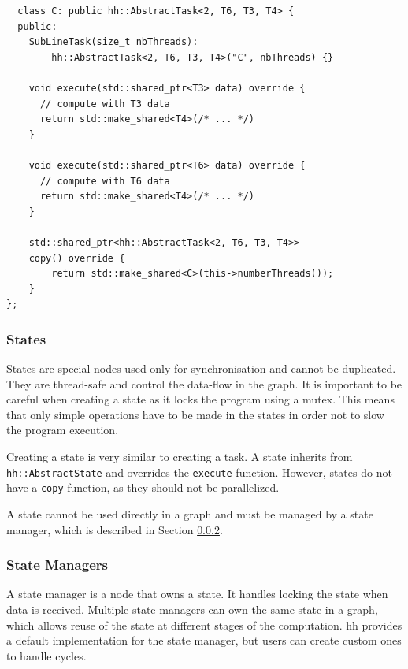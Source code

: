 \begin{listing}[ht!]
\begin{verbatim}
  class C: public hh::AbstractTask<2, T6, T3, T4> {
  public:
    SubLineTask(size_t nbThreads):
        hh::AbstractTask<2, T6, T3, T4>("C", nbThreads) {}

    void execute(std::shared_ptr<T3> data) override {
      // compute with T3 data
      return std::make_shared<T4>(/* ... */)
    }

    void execute(std::shared_ptr<T6> data) override {
      // compute with T6 data
      return std::make_shared<T4>(/* ... */)
    }

    std::shared_ptr<hh::AbstractTask<2, T6, T3, T4>>
    copy() override {
        return std::make_shared<C>(this->numberThreads());
    }
};
\end{verbatim}
\label{lst:hhtask}
\end{listing}

\subsubsection{States}

States are special nodes used only for synchronisation and cannot be duplicated.
They are thread-safe and control the data-flow in the graph. It is important to
be careful when creating a state as it locks the program using a mutex. This
means that only simple operations have to be made in the states in order not to
slow the program execution.

Creating a state is very similar to creating a task. A state inherits from
\texttt{hh::AbstractState} and overrides the \texttt{execute} function. However,
states do not have a \texttt{copy} function, as they should not be parallelized.

A state cannot be used directly in a graph and must be managed by a state
manager, which is described in Section \ref{sec:statemanager}.

\subsubsection{State Managers}
\label{sec:statemanager}

A state manager is a node that owns a state. It handles locking the state when
data is received. Multiple state managers can own the same state in a graph,
which allows reuse of the state at different stages of the computation. \gls{hh}
provides a default implementation for the state manager, but users can create
custom ones to handle cycles.

